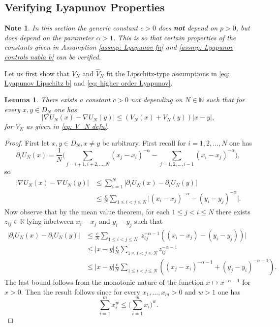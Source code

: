 \documentclass{article}
\newtheorem{lemma}{Lemma}
\newtheorem{note}{Note}
\begin{document}
\subsection{Verifying Lyapunov Properties}
\begin{note}
    In this section the generic constant $c>0$ does \textbf{not} depend on $p>0$, but does depend on the parameter $\alpha>1$. This is so that certain properties of the constants given in Assumption \ref{assmp: Lyapunov fn} and \ref{assmp: Lyapunov controls nabla b} can be verified.
\end{note}
Let us first show that $V_N$ and $\hat{V}_N$ fit the Lipschitz-type assumptions in \eqref{eq: Lyapunov Lipschitz b} and \eqref{eq: higher order Lyapunov}.
\begin{lemma}\label{lem: Lyapunov lipschitz}
    There exists a constant $c>0$ not depending on $N\in \mathbb{N}$ such that for every $x,y \in D_N$ one has
   \begin{equation}
       \lvert \nabla U_N(x)-\nabla U_N(y)\rvert\leq (V_N(x)+V_N(y)) \lvert x-y\rvert,
   \end{equation}
   for $V_N$ as given in \eqref{eq: V_N defn}.
\end{lemma}
\begin{proof}
     First let $x,y \in D_N, x\not=y$ be arbitrary. First recall for $i=1,2,...,N$ one has
     \begin{equation}
\partial_i U_N(x)=\frac{1}{N}\biggr (\sum_{j=i+1,i+2,...,N}( x_j-x_i)^{-\alpha}-\sum_{j=1,2,...,i-1}( x_i-x_j)^{-\alpha}\biggr),
     \end{equation}
so
\begin{align}
    \lvert \nabla U_N(x)-\nabla U_N(y)\rvert&\leq \sum_{i=1}^N\lvert  \partial_i U_N(x)-\partial_i U_N(y) \rvert\nonumber \\
    &\leq \frac{c}{N}\sum_{1\leq i<j\leq N}\lvert (x_i-x_j)^{-\alpha}-(y_i-y_j)^{-\alpha}\rvert.
\end{align}
 Now observe that by the mean value theorem, for each $1\leq j<i\leq N$ there exists $z_{ij}\in \mathbb{R}$ lying inbetween $x_i-x_j$ and $y_i-y_j$ such that
 \begin{align}
 \lvert  \partial_i U_N(x)-\partial_i U_N(y) \rvert &\leq \frac{c}{N}\sum_{1\leq i<j\leq N}\lvert z_{ij}^{-\alpha-1}((x_i-x_j)-(y_i-y_j))\rvert\nonumber \\
  &\leq \lvert x-y\rvert\frac{c}{N}\sum_{1\leq i<j\leq N} z_{ij}^{-\alpha-1}\nonumber \\
  &\leq \lvert x-y\rvert\frac{c}{N}\sum_{1\leq i<j\leq N} ( ( x_j-x_i)^{-\alpha-1}+( y_j-y_i)^{-\alpha-1}).
 \end{align}
 The last bound follows from the monotonic nature of the function $x\mapsto x^{-\alpha-1}$ for $x>0$. Then the result follows since for every $x_1,...,x_m>0$ and $w>1$ one has
 \begin{equation}\label{eq: power expression}
  \sum_{i=1}^mx_i^w \leq  \biggr ( \sum_{i=1}^mx_i \biggr)^w .
 \end{equation}
\end{proof}
\end{document}
